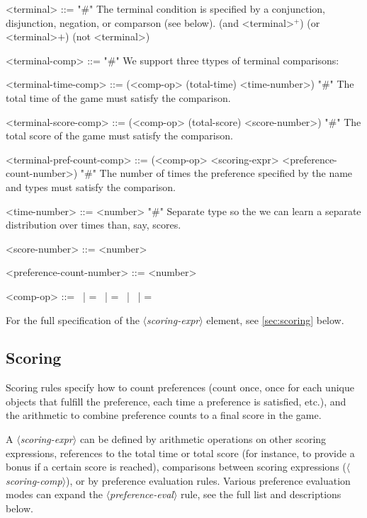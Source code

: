 \documentclass{article}
\newcommand{\dsl}[1]{{\it $\langle$#1$\rangle$}}
\begin{document}
\begin{grammar}
<terminal> ::= "#" The terminal condition is specified by a conjunction, disjunction, negation, or comparson (see below).
        \alt (and <terminal>$^+$)
        \alt (or <terminal>$+$)
        \alt (not <terminal>)

<terminal-comp> ::= "#" We support three ttypes of terminal comparisons:


    <terminal-time-comp> ::= (<comp-op> (total-time) <time-number>) "#" The total time of the game must satisfy the comparison.

    <terminal-score-comp> ::= (<comp-op> (total-score) <score-number>) "#" The total score of the game must satisfy the comparison.

    <terminal-pref-count-comp> ::= (<comp-op> <scoring-expr> <preference-count-number>) "#" The number of times the preference specified by the name and types must satisfy the comparison.

    <time-number> ::= <number>  "#" Separate type so the we can learn a separate distribution over times than, say, scores.

    <score-number> ::= <number>

    <preference-count-number> ::= <number>

    <comp-op> ::=  \textlangle \ | \textlangle = \ | = \ | \textrangle \ | \textrangle =



\end{grammar}
For the full specification of the \dsl{scoring-expr} element, see \autoref{sec:scoring} below.



\subsection{Scoring} \label{sec:scoring}
Scoring rules specify how to count preferences (count once, once for each unique objects that fulfill the preference, each time a preference is satisfied, etc.), and the arithmetic to combine preference counts to a final score in the game.

A \dsl{scoring-expr} can be defined by arithmetic operations on other scoring expressions, references to the total time or total score (for instance, to provide a bonus if a certain score is reached), comparisons between scoring expressions (\dsl{scoring-comp}), or by preference evaluation rules.
Various preference evaluation modes can expand the \dsl{preference-eval} rule, see the full list and descriptions below.
\end{document}
